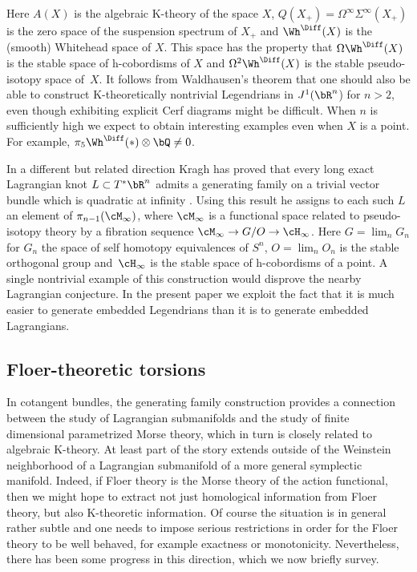 Here $A(X)$ is the algebraic K-theory of the space $X$, $Q(X_+)=\Omega^\infty \Sigma^\infty (X_+)$ is the zero space of the suspension spectrum of $X_+$ and $\Wh^{\Diff}(X)$ is the (smooth) Whitehead space of $X$. This space has the property that $\Omega \Wh^{\Diff}(X)$ is the stable space of h-cobordisms of $X$ and $\Omega^2\Wh^{\Diff}(X)$ is the stable pseudo-isotopy space of~$X$. It follows from Waldhausen's theorem that one should also be able to construct K\nobreakdash-theoretically nontrivial Legendrians in $J^1(\bR^n$) for $n>2$, even though exhibiting explicit Cerf diagrams might be difficult. When $n$ is sufficiently high we expect to obtain interesting examples even when $X$ is a point. For example, $\pi_5 \Wh^{\Diff }( \ast ) \otimes \bQ \neq 0$.

In a different but related direction Kragh has proved that every long exact Lagran\-gian knot $L \subset T^*\bR^n$ admits a generating family on a trivial vector bundle which is quadratic at infinity \cite{K18}. Using this result he assigns to each such $L$ an element of $\pi_{n-1}(\cM_\infty)$, where $\cM_\infty$ is a functional space related to pseudo-isotopy theory by a fibration sequence $\cM_\infty \to G/O \to \cH_\infty$. Here $G=\lim_n G_n$ for $G_n$ the space of self homotopy equivalences of $S^n$, $O=\lim_nO_n$ is the stable orthogonal group and~$\cH_\infty$ is the stable space of h-cobordisms of a point. A single nontrivial example of this construction would disprove the nearby Lagrangian conjecture. In the present paper we exploit the fact that it is much easier to generate embedded Legendrians than it is to generate embedded Lagrangians.

\subsection{Floer-theoretic torsions}
In cotangent bundles, the generating family construction provides a connection between the study of Lagrangian submanifolds and the study of finite dimensional parametrized Morse theory, which in turn is closely related to algebraic K-theory. At least part of the story extends outside of the Weinstein neighborhood of a Lagrangian submanifold of a more general symplectic manifold. \hbox{Indeed}, if Floer theory is the Morse theory of the action functional, then we might hope to extract not just homological information from Floer theory, but also K-theoretic information. Of course the situation is in general rather subtle and one needs to impose serious restrictions in order for the Floer theory to be well behaved, for example exactness or monotonicity. Nevertheless, there has been some progress in this direction, which we now briefly survey.

